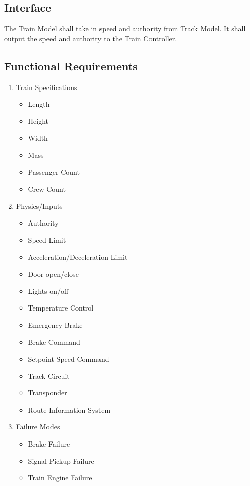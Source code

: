 \documentclass{scrreprt}
\begin{document}
\subsection{Interface}
The Train Model shall take in speed and authority from Track Model. It shall
output the speed and authority to the Train Controller.

\subsection{Functional Requirements}
\begin{enumerate}
  \item Train Specifications
   \begin{itemize}
    \item Length
    \item Height
    \item Width
    \item Mass
    \item Passenger Count
    \item Crew Count
   \end{itemize}
  \item Physics/Inputs
  \begin{itemize}
   \item Authority
   \item Speed Limit
   \item Acceleration/Deceleration Limit
   \item Door open/close
   \item Lights on/off
   \item Temperature Control
   \item Emergency Brake
   \item Brake Command
   \item Setpoint Speed Command
   \item Track Circuit
   \item Transponder
   \item Route Information System
  \end{itemize}
  \item Failure Modes
    \begin{itemize}
     \item Brake Failure
     \item Signal Pickup Failure
     \item Train Engine Failure
    \end{itemize}
\end{enumerate}
\end{document}
